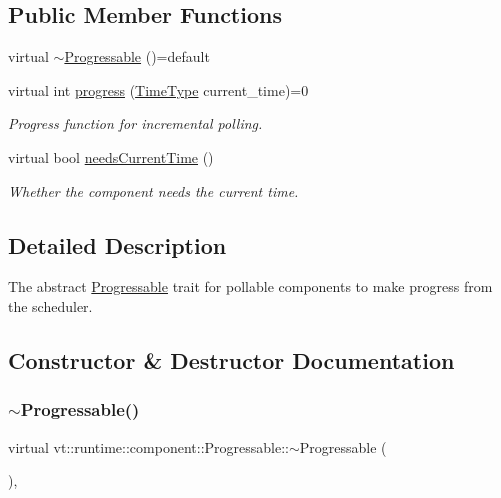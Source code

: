 \subsection*{Public Member Functions}
\begin{DoxyCompactItemize}
\item 
virtual \hyperlink{structvt_1_1runtime_1_1component_1_1_progressable_a6c4025ca0a513de3a011ce214dc5417d}{$\sim$\+Progressable} ()=default
\item 
virtual int \hyperlink{structvt_1_1runtime_1_1component_1_1_progressable_a75f1e623643f2273835fdf047d3d0cd3}{progress} (\hyperlink{namespacevt_a2b9f28078dc309ad0706b69ded743e69}{Time\+Type} current\+\_\+time)=0
\begin{DoxyCompactList}\small\item\em Progress function for incremental polling. \end{DoxyCompactList}\item 
virtual bool \hyperlink{structvt_1_1runtime_1_1component_1_1_progressable_a86dd4c58e43f7dbf6bd67f7a8e6df088}{needs\+Current\+Time} ()
\begin{DoxyCompactList}\small\item\em Whether the component needs the current time. \end{DoxyCompactList}\end{DoxyCompactItemize}


\subsection{Detailed Description}
The abstract {\ttfamily \hyperlink{structvt_1_1runtime_1_1component_1_1_progressable}{Progressable}} trait for pollable components to make progress from the scheduler. 

\subsection{Constructor \& Destructor Documentation}
\mbox{\label{structvt_1_1runtime_1_1component_1_1_progressable_a6c4025ca0a513de3a011ce214dc5417d}} 
\subsubsection{\texorpdfstring{$\sim$\+Progressable()}{~Progressable()}}
{\footnotesize\ttfamily virtual vt\+::runtime\+::component\+::\+Progressable\+::$\sim$\+Progressable (\begin{DoxyParamCaption}{ }\end{DoxyParamCaption})\hspace{0.3cm}{\ttfamily [virtual]}, {\ttfamily [default]}}



